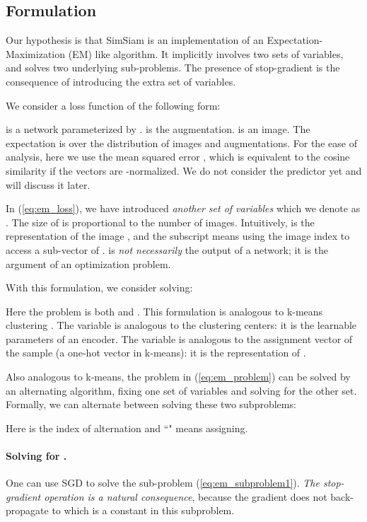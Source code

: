 \documentclass[final]{cvpr}
\begin{document}
\subsection{Formulation}

Our hypothesis is that SimSiam is an implementation of an Expectation-Maximization (EM) like algorithm. It implicitly involves two sets of variables, and solves two underlying sub-problems. The presence of stop-gradient is the consequence of introducing the extra set of variables.

We consider a loss function of the following form:

 is a network parameterized by .
 is the augmentation.
 is an image.
The expectation  is over the distribution of images and augmentations.
For the ease of analysis, here we use the mean squared error , which is equivalent to the cosine similarity if the vectors are -normalized.
We do not consider the predictor yet and will discuss it later.

In (\ref{eq:em_loss}), we have introduced \emph{another set of variables} which we denote as .
The size of  is proportional to the number of images.
Intuitively,  is the representation of the image , and the subscript  means using the image index to access a sub-vector of . 
 is \emph{not necessarily} the output of a network; it is the argument of an optimization problem.

With this formulation, we consider solving:

Here the problem is \wrt both  and .
This formulation is analogous to k-means clustering \cite{MacQueen1967}. The variable  is analogous to the clustering centers: it is the learnable parameters of an encoder. The variable  is analogous to the assignment vector of the sample  (a one-hot vector in k-means): it is the representation of . 

Also analogous to k-means, the problem in (\ref{eq:em_problem}) can be solved by an alternating algorithm, fixing one set of variables and solving for the other set. Formally, we can alternate between solving these two subproblems:

Here  is the index of alternation and ``" means assigning.

\paragraph{Solving for .} One can use SGD to solve the sub-problem (\ref{eq:em_subproblem1}).
\emph{The stop-gradient operation is a natural consequence}, because the gradient does not back-propagate to  which is a constant in this subproblem.
\end{document}
